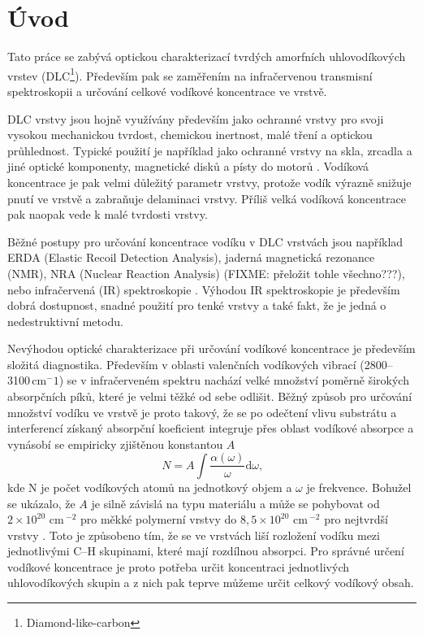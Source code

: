 \chapter{Úvod}
\setcounter{page}{1}

Tato práce se zabývá optickou charakterizací tvrdých amorfních uhlovodíkových vrstev (DLC\footnote{Diamond-like-carbon}). Především pak se zaměřením na infračervenou transmisní spektroskopii a určování celkové vodíkové koncentrace ve vrstvě.

DLC vrstvy jsou hojně využívány především jako ochranné vrstvy pro svoji vysokou mechanickou tvrdost, chemickou inertnost, malé tření a optickou průhlednost. Typické použití je například jako ochranné vrstvy na skla, zrcadla a jiné optické komponenty, magnetické disků a písty do motorů \cite{Robertson2002}. Vodíková koncentrace je pak velmi důležitý parametr vrstvy, protože vodík výrazně snižuje pnutí ve vrstvě a zabraňuje delaminaci vrstvy. Příliš velká vodíková koncentrace pak naopak vede k malé tvrdosti vrstvy. 

Běžné postupy pro určování koncentrace vodíku v DLC vrstvách jsou například ERDA (Elastic Recoil Detection Analysis), jaderná magnetická rezonance (NMR), NRA (Nuclear Reaction Analysis) (FIXME: přeložit tohle všechno???), nebo infračervená (IR) spektroskopie \cite{Robertson2002}. Výhodou IR spektroskopie je především dobrá dostupnost, snadné použití pro tenké vrstvy a také fakt, že je jedná o nedestruktivní metodu. 

Nevýhodou optické charakterizace při určování vodíkové koncentrace je především složitá diagnostika. Především v oblasti valenčních vodíkových vibrací (2800--3100\,cm$^-1$) se v infračerveném spektru nachází velké množství poměrně širokých absorpčních píků, které je velmi těžké od sebe odlišit. Běžný způsob pro určování množství vodíku ve vrstvě je proto takový, že se po odečtení vlivu substrátu a interferencí získaný absorpční koeficient integruje přes oblast vodíkové absorpce a vynásobí se empiricky zjištěnou konstantou $A$
\begin{equation}
N = A \int \frac{\alpha(\omega)}{\omega} \mathrm{d}\omega \text{,}
\end{equation}
kde N je počet vodíkových atomů na jednotkový objem a $\omega$ je frekvence. Bohužel se ukázalo, že $A$ je silně závislá na typu materiálu a může se pohybovat od $2 \times 10^{20}$ cm\,$^{-2}$ pro měkké polymerní vrstvy do $8,5 \times 10^{20}$ cm\,$^{-2}$ pro nejtvrdší vrstvy \cite{jacob1996}. Toto je způsobeno tím, že se ve vrstvách liší rozložení vodíku mezi jednotlivými C--H skupinami, které mají rozdílnou absorpci. Pro správné určení vodíkové koncentrace je proto potřeba určit koncentraci jednotlivých uhlovodíkových skupin a z nich pak teprve můžeme určit celkový vodíkový obsah. 

